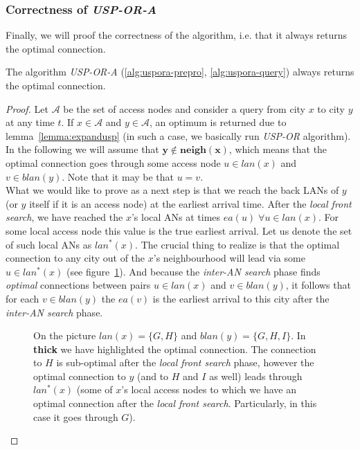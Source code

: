 	\subsubsection{Correctness of \textit{USP-OR-A}}
	
		\noindent Finally, we will proof the correctness of the algorithm, i.e. that it always returns the optimal connection.
		
		\begin{theorem}
			The algorithm \textit{USP-OR-A} (\ref{alg:uspora-prepro}, \ref{alg:uspora-query}) always returns the optimal connection.
		\end{theorem}
		
		\begin{proof}
			Let $\mathcal{A}$ be the set of access nodes and consider a query from city $x$ to city $y$ at any time $t$. If $x \in \mathcal{A}$ and $y \in \mathcal{A}$, an optimum is returned due to lemma~\ref{lemma:expandusp} (in such a case, we basically run \textit{USP-OR} algorithm). \\
			
			\noindent In the following we will assume that $\bm{y \not \in neigh(x)}$, which means that the optimal connection goes through some access node $u \in lan(x)$ and $v \in blan(y)$. Note that it may be that $u = v$. \\
			
			\noindent What we would like to prove as a next step is that we reach the back LANs of $y$ (or $y$ itself if it is an access node) at the earliest arrival time. After the \textit{local front search}, we have reached the $x$'s local ANs at times $ea(u) \; \forall u \in lan(x)$. For some local access node this value is the true earliest arrival. Let us denote the set of such local ANs as $lan^{*}(x)$. The crucial thing to realize is that the optimal connection to any city out of the $x$'s neighbourhood will lead via some $u \in lan^{*}(x)$ (see figure~\ref{fig:usporaproof2}). And because the \textit{inter-AN search} phase finds \textit{optimal} connections between pairs $u \in lan(x)$ and $v \in blan(y)$, it follows that for each $v \in blan(y)$ the $ea(v)$ is the earliest arrival to this city after the \textit{inter-AN search} phase.
			
			\begin{figure}[h!]
				\begin{center}
				\end{center}
				\caption{\label{fig:usporaproof2} On the picture $lan(x) = \{G, H\}$ and $blan(y) = \{G, H, I\}$. In \textbf{thick} we have highlighted the optimal connection. The connection to $H$ is sub-optimal after the \textit{local front search} phase, however the optimal connection to $y$ (and to $H$ and $I$ as well) leads through $lan^{*}(x)$ (some of $x$'s local access nodes to which we have an optimal connection after the \textit{local front search}. Particularly, in this case it goes through $G$).}
			\end{figure}
			

\end{proof}
